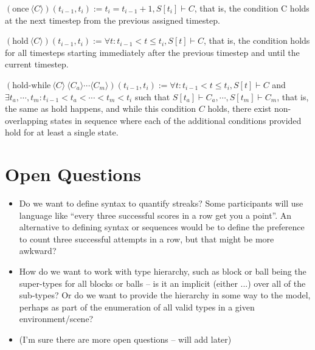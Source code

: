 \documentclass{article}
\begin{document}
$(\text{once}\ \langle C \rangle)(t_{i-1}, t_i) := t_i = t_{i-1} + 1, S[t_i] \vdash C$, that is, the condition C holds at the next timestep from the previous assigned timestep.

$(\text{hold}\ \langle C \rangle)(t_{i-1}, t_i) := \forall t:  t_{i-1} < t \leq t_i, S[t] \vdash C$, that is, the condition holds for all timesteps starting immediately after the previous timestep and until the current timestep. 

$(\text{hold-while}\ \langle C \rangle \ \langle C_a \rangle \cdots \langle C_m \rangle)(t_{i-1}, t_i) := \forall t:  t_{i-1} < t \leq t_i, S[t] \vdash C$ and $\exists t_a, \cdots, t_m: t_{i-1} < t_a < \cdots < t_m < t_i$ such that $S[t_a] \vdash C_a, \cdots, S[t_m] \vdash C_m$, that is, the same as hold happens, and while this condition $C$ holds, there exist non-overlapping states in sequence where each of the additional conditions provided hold for at least a single state.



\section{Open Questions}
\begin{itemize}
    \item Do we want to define syntax to quantify streaks? Some participants will use language like ``every three successful scores in a row get you a point''. An alternative to defining syntax or sequences would be to define the preference to count three successful attempts in a row, but that might be more awkward?
    
    \item How do we want to work with type hierarchy, such as block or ball being the super-types for all blocks or balls -- is it an implicit (either ...) over all of the sub-types? Or do we want to provide the hierarchy in some way to the model, perhaps as part of the enumeration of all valid types in a given environment/scene?
    
    \item (I'm sure there are more open questions -- will add later)
\end{itemize}
\end{document}
